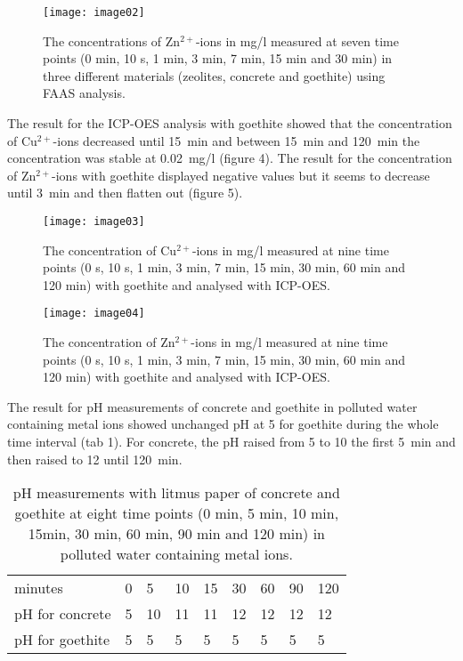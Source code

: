 \begin{figure}[H]
    \centering
    \texttt{[image: image02]}
    \caption{The concentrations of Zn$^{2+}$-ions in mg/l measured at seven time
        points (0 min, 10 s, 1 min, 3 min, 7 min, 15 min and 30 min) in three
            different materials (zeolites, concrete and goethite) using FAAS
            analysis.}
\end{figure}

The result for the ICP-OES analysis with goethite showed that the concentration
of Cu$^{2+}$-ions decreased until 15~min and between 15~min and 120~min the
concentration was stable at 0.02~mg/l (figure 4). The result for the
concentration of Zn$^{2+}$-ions with goethite displayed negative values but it seems
to decrease until 3~min and then flatten out (figure 5).

\begin{figure}[H]
    \centering
    \texttt{[image: image03]}
    \caption{The concentration of Cu$^{2+}$-ions in mg/l measured at nine time
        points (0 s, 10 s, 1 min, 3 min, 7 min, 15 min, 30 min, 60 min and 120
                min) with goethite and analysed with ICP-OES.}
\end{figure}


\begin{figure}[H]
    \centering
    \texttt{[image: image04]}
    \caption{The concentration of Zn$^{2+}$-ions in mg/l measured at nine time
        points (0 s, 10 s, 1 min, 3 min, 7 min, 15 min, 30 min, 60 min and 120
                min) with goethite and analysed with ICP-OES.}
\end{figure}

The result for pH measurements of concrete and goethite in polluted water
containing metal ions showed unchanged pH at 5 for goethite during the whole
time interval (tab 1). For concrete, the pH raised from 5 to 10 the first 5~min
and then raised to 12 until 120~min.

\begin{table}[H]
\centering
\caption{pH measurements with litmus paper of concrete and goethite at eight
    time points (0 min, 5 min, 10 min, 15min, 30 min, 60 min, 90 min and 120
            min) in polluted water containing metal ions.}
\label{tab:ph}
\begin{tabular}{lllllllll}
minutes         & 0 & 5 & 10 & 15 & 30 & 60 & 90 & 120 \\
pH for concrete & 5 & 10 & 11 & 11 & 12 & 12 & 12 & 12 \\
pH for goethite & 5 & 5 & 5 & 5 & 5 & 5 & 5 & 5
\end{tabular}
\end{table}


